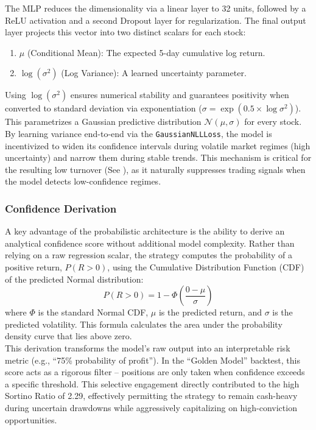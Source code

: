 \documentclass[twoside,final]{hcmut-report}
\newcommand{\result}[1]{\fcolorbox{red}{white}{#1}}
\begin{document}
The MLP reduces the dimensionality via a linear layer to 32 units, followed by a ReLU activation and a second Dropout layer for regularization. The final output layer projects this vector into two distinct scalars for each stock:

\begin{enumerate}
  \item $\mu$ (Conditional Mean): The expected 5-day cumulative log return.
  \item $\log(\sigma^2)$ (Log Variance): A learned uncertainty parameter.
\end{enumerate}

Using $\log(\sigma^2)$ ensures numerical stability and guarantees positivity when converted to standard deviation via exponentiation ($\sigma = \exp(0.5 \times \log \sigma^2)$). This parametrizes a Gaussian predictive distribution $\mathcal{N}(\mu, \sigma)$ for every stock. By learning variance end-to-end via the \texttt{GaussianNLLLoss}, the model is incentivized to widen its confidence intervals during volatile market regimes (high uncertainty) and narrow them during stable trends. This mechanism is critical for the resulting low turnover (See \result{Table~\ref{tab:backtest_metrics}}), as it naturally suppresses trading signals when the model detects low-confidence regimes.

\subsubsection{Confidence Derivation}
\label{section_4.1.4}
A key advantage of the probabilistic architecture is the ability to derive an analytical confidence score without additional model complexity. Rather than relying on a raw regression scalar, the strategy computes the probability of a positive return, $P(R > 0)$, using the Cumulative Distribution Function (CDF) of the predicted Normal distribution:
\[
  P(R > 0) = 1 - \Phi\left( \frac{0 - \mu}{\sigma} \right)
\]
where $\Phi$ is the standard Normal CDF, $\mu$ is the predicted return, and $\sigma$ is the predicted volatility. This formula calculates the area under the probability density curve that lies above zero.\\

This derivation transforms the model's raw output into an interpretable risk metric (e.g., ``75\% probability of profit''). In the ``Golden Model'' backtest, this score acts as a rigorous filter -- positions are only taken when confidence exceeds a specific threshold. This selective engagement directly contributed to the high Sortino Ratio of 2.29, effectively permitting the strategy to remain cash-heavy during uncertain drawdowns while aggressively capitalizing on high-conviction opportunities.
\end{document}

